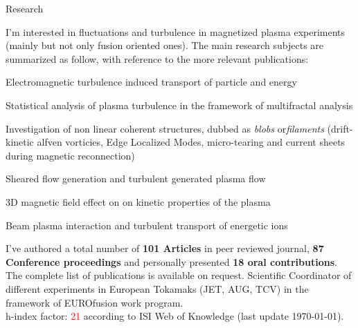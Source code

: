 \begin{cvblock}{Research}
  \end{cvblock}
I'm interested in fluctuations and turbulence in magnetized plasma
experiments (mainly but not only fusion oriented
ones). The main research subjects are summarized as follow, with
reference to the more relevant publications: 
\begin{description}[labelindent=0.5pt, labelsep*=0.4em, leftmargin=!, itemsep=0.05ex]
\item[(a)] Electromagnetic turbulence induced transport of particle
  and energy \cite{Spolaore:2004p245, Antoni:2000p3587}
\item[(b)] Statistical analysis of plasma turbulence in the framework of multifractal analysis \cite{Antoni:2001p3221, Carbone:2002p2809, Vianello:2016bm}
\item[(c)] Investigation of non linear
  coherent structures, dubbed as \emph{blobs} or\emph{filaments}
 (drift-kinetic alfven vorticies, Edge Localized Modes, micro-tearing and current
sheets during magnetic reconnection) \cite{Vianello:2010p4670, Spolaore:2015ij, PhysRevLett.106.125002, Furno:2011cs}
\item[(d)] Sheared flow generation and turbulent generated plasma
flow \cite{Vianello:2005p1976}
\item[(e)] 3D magnetic field effect on on kinetic
properties of the plasma \cite{Vianello:2015ek}
\item[(f)] Beam plasma interaction and turbulent transport of
  energetic ions
\end{description}

I've authored a total number of \textbf{101 Articles} in peer reviewed journal,
\textbf{87 Conference proceedings} and personally presented \textbf{18 oral
contributions}. The complete list of publications is available on
request. Scientific Coordinator of different experiments
in European Tokamaks (JET, AUG, TCV) in the framework of EUROfusion work program. \\
h-index factor: \textcolor{red}{21} according to ISI Web of Knowledge
(last update \today). 


\printbibliography[type=article,  title = {Relevant publications}, heading=subbibliography, prefixnumbers={A}, resetnumbers=true]

